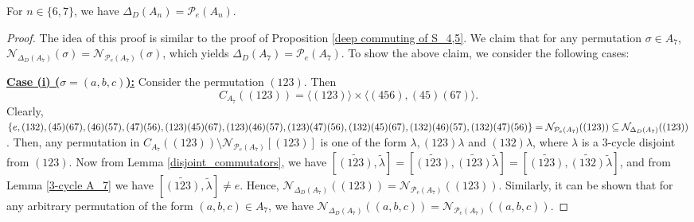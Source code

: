 \documentclass[10pt,a4paper]{amsart}
\begin{document}
\begin{proposition}\label{deep commuting of A_6,7}
For $n\in\{6,7\}$, we have $\Delta_D(A_n)=\mathcal{P}_e(A_n)$.    
\end{proposition}

\begin{proof}
The idea of this proof is similar to the proof of Proposition \ref{deep commuting of S_4,5}. We claim that for any permutation $\sigma\in A_7$, $\mathcal{N}_{\Delta_D(A_7)}(\sigma)=\mathcal{N}_{\mathcal{P}_e(A_7)}(\sigma)$, which yields $\Delta_D(A_7)=\mathcal{P}_e(A_7)$. To show the above claim, we consider the following cases:  

\vspace{.3cm}
\noindent\underline{\bf{Case (i) ($\sigma=(a,b,c)$):}} Consider the permutation $(123)$. Then \[C_{A_7}((123))=\langle (123)\rangle\times\langle (456),(45)(67)\rangle.\] Clearly, $\{e,(132),(45)(67),(46)(57),(47)(56),(123)(45)(67),(123)(46)(57),(123)(47)(56),\\ (132)(45)(67),(132)(46)(57),(132)(47)(56)\}=\mathcal{N}_{\mathcal{P}_e(A_7)}((123))\subseteq \mathcal{N}_{\Delta_D(A_7)}((123))$. Then, any permutation in $C_{A_7}((123))\setminus\mathcal{N}_{\mathcal{P}_e(A_7)}[(123)]$ is one of the form $\lambda, (123)\lambda$ and $(132)\lambda$, where $\lambda$ is a $3$-cycle disjoint from $(123)$. Now from Lemma \ref{disjoint_commutators}, we have $[\tilde{(123)},\tilde{\lambda}]=[\tilde{(123)},\tilde{(123)}\tilde{\lambda}]=[\tilde{(123)},\tilde{(132)}\tilde{\lambda}]$, and from Lemma \ref{3-cycle A_7}
we have $[\tilde{(123)},\tilde{\lambda}]\neq e$. Hence, $\mathcal{N}_{\Delta_D(A_7)}((123))=\mathcal{N}_{\mathcal{P}_e(A_7)}((123))$. Similarly, it can be shown that for any arbitrary permutation of the form $(a,b,c)\in A_7$, we have $\mathcal{N}_{\Delta_D(A_7)}((a,b,c))=\mathcal{N}_{\mathcal{P}_e(A_7)}((a,b,c))$.


\end{proof}
\end{document}
